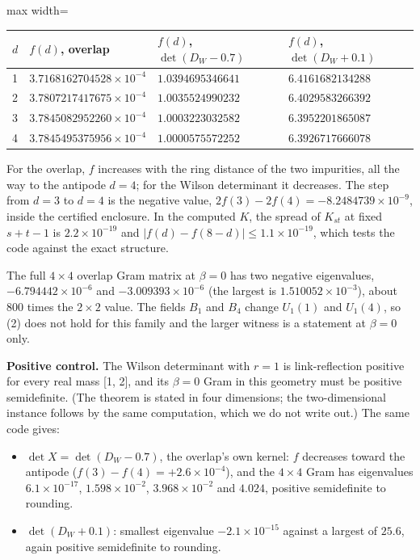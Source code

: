 \documentclass[11pt,a4paper]{article}
\begin{document}
\begin{center}
\begin{adjustbox}{max width=\linewidth}
\begin{tabular}{llll}
\hline
{}{\bfseries\boldmath $d$} & {\bfseries\boldmath $f(d)$, overlap} & {\bfseries\boldmath $f(d)$, $\det(D_W-0.7)$} & {\bfseries\boldmath $f(d)$, $\det(D_W+0.1)$} \\
\hline
{}1 & $3.7168162704528\times10^{-4}$ & $1.0394695346641$ & $6.4161682134288$ \\
{}2 & $3.7807217417675\times10^{-4}$ & $1.0035524990232$ & $6.4029583266392$ \\
{}3 & $3.7845082952260\times10^{-4}$ & $1.0003223032582$ & $6.3952201865087$ \\
{}4 & $3.7845495375956\times10^{-4}$ & $1.0000575572252$ & $6.3926717666078$ \\
\hline
\end{tabular}
\end{adjustbox}
\end{center}

For the overlap, $f$ increases with the ring distance of the two impurities, all the way to the antipode $d=4$; for the Wilson determinant it decreases. The step from $d=3$ to $d=4$ is the negative value, $2f(3)-2f(4)=-8.2484739\times10^{-9}$, inside the certified enclosure. In the computed $K$, the spread of $K_{st}$ at fixed $s+t-1$ is $2.2\times10^{-19}$ and $|f(d)-f(8-d)|\le1.1\times10^{-19}$, which tests the code against the exact structure.

The full $4\times4$ overlap Gram matrix at $\beta=0$ has two negative eigenvalues, $-6.794442\times10^{-6}$ and $-3.009393\times10^{-6}$ (the largest is $1.510052\times10^{-3}$), about 800 times the $2\times2$ value. The fields $B_1$ and $B_4$ change $U_1(1)$ and $U_1(4)$, so (2) does not hold for this family and the larger witness is a statement at $\beta=0$ only.

{\bfseries\boldmath Positive control.} The Wilson determinant with $r=1$ is link-reflection positive for every real mass [1, 2], and its $\beta=0$ Gram in this geometry must be positive semidefinite. (The theorem is stated in four dimensions; the two-dimensional instance follows by the same computation, which we do not write out.) The same code gives:

\begin{itemize}
\item{} $\det X=\det(D_W-0.7)$, the overlap's own kernel: $f$ decreases toward the antipode ($f(3)-f(4)=+2.6\times10^{-4}$), and the $4\times4$ Gram has eigenvalues $6.1\times10^{-17}$, $1.598\times10^{-2}$, $3.968\times10^{-2}$ and $4.024$, positive semidefinite to rounding.
\item{} $\det(D_W+0.1)$: smallest eigenvalue $-2.1\times10^{-15}$ against a largest of $25.6$, again positive semidefinite to rounding.
\end{itemize}
\end{document}
